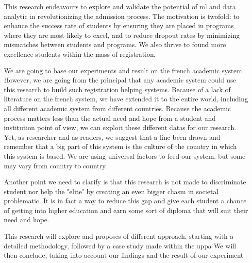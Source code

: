 \documentclass[../main.tex]{subfiles}
\begin{document}
This research endeavours to explore and validate the potential of \acrfull{ml} and data analytic in revolutionizing the admission process. The motivation is twofold: to enhance the success rate of students by ensuring they are placed in programs where they are most likely to excel, and to reduce dropout rates by minimizing mismatches between students and programs. We also thrive to found more excellence students within the mass of registration.

We are going to base our experiments and result on the french academic system. However, we are going from the principal that any academic system could use this research to build such registration helping systems. Because of a lack of literature on the french system, we have extended it to the entire world, including all different academic system from different countries. Because the academic process matters less than the actual need and hope from a student and institution point of view, we can exploit these different datas for our research. Yet, as researcher and as readers, we suggest that a line been drawn and remember that a big part of this system is the culture of the country in which this system is based. We are using universal factors to feed our system, but some may vary from country to country.

Another point we need to clarify is that this research is not made to discriminate student nor help the "elite" by creating an even bigger chasm in societal problematic. It is in fact a way to reduce this gap and give each student a chance of getting into higher education and earn some sort of diploma that will suit their need and hope.

This research will explore and proposes of different approach, starting with a detailed methodology, followed by a case study made within the \acrfull{uppa}
We will then conclude, taking into account our findings and the result of our experiment 
\end{document}
